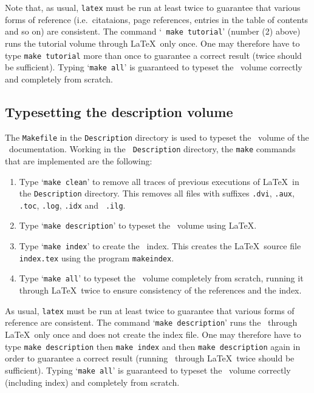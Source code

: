 \documentclass[12pt]{article}
\def\bnum#1{{\raise0.6pt\hbox{(}#1\raise0.6pt\hbox{)}}}
\def\latex{{\LaTeX}}
\begin{document}
\noindent Note that, as usual, {\tt latex} must be run at least twice to
guarantee that various forms of reference (i.e.\ citataions, page references,
entries in the table of contents and so on) are consistent.  The command `{\tt
make tutorial}' (number \bnum{2} above) runs the tutorial volume through
\LaTeX\ only once.  One may therefore have to type {\tt make tutorial} more
than once to guarantee a correct result (twice should be sufficient).  Typing
`{\tt make all}' is guaranteed to typeset the \TUTORIAL\ volume correctly and
completely from scratch.

\subsection{Typesetting the description volume}

The {\tt Makefile} in the {\tt Description} directory is used to typeset the
\DESCRIPTION\ volume of the \HOL\ documentation.  Working in the {\tt
Description} directory, the {\tt make} commands that are implemented are the
following:

\begin{enumerate}

\item Type `{\tt make clean}' to remove all traces of previous executions of
\LaTeX\ in the {\tt Description} directory.  This removes all files with
suffixes {\tt .dvi}, {\tt .aux}, {\tt .toc}, {\tt .log}, {\tt .idx} and {\tt
.ilg}.

\item Type `{\tt make description}' to typeset the \DESCRIPTION\ volume using
\latex.

\item Type `{\tt make index}' to create the \DESCRIPTION\ index.  This creates
the \LaTeX\ source file {\tt index.tex} using the program {\tt makeindex}.

\item Type `{\tt make all}' to typeset the \DESCRIPTION\ volume completely from
scratch, running it through \latex\ twice to ensure consistency of the
references and the index.

\end{enumerate}

\noindent As usual, {\tt latex} must be run at least twice to guarantee that
various forms of reference are consistent.  The command `{\tt make
description}' runs the \DESCRIPTION\ through \LaTeX\ only once and does not
create the index file.  One may therefore have to type {\tt make description}
then {\tt make index} and then {\tt make description} again in order to
guarantee a correct result (running \DESCRIPTION\ through \LaTeX\ twice should
be sufficient).  Typing `{\tt make all}' is guaranteed to typeset the
\DESCRIPTION\ volume correctly (including index) and completely from scratch.
\end{document}
